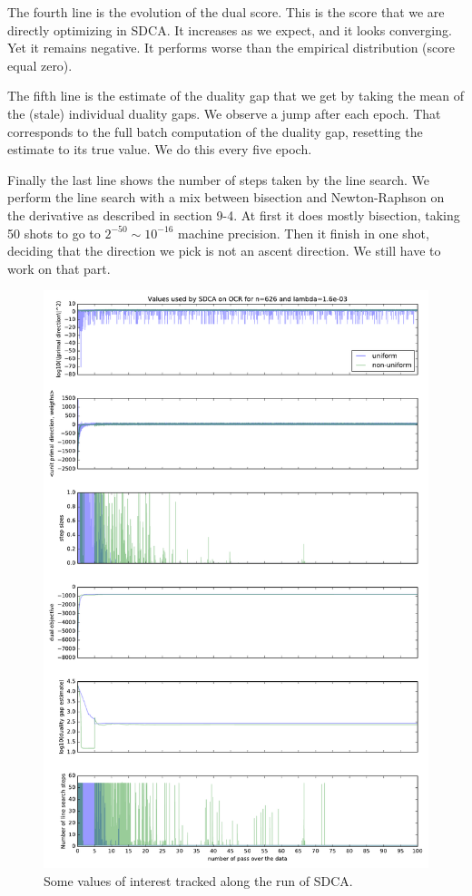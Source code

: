 \documentclass{article}
\DeclareMathOperator{\1}{\mathbb{1}}
\begin{document}
The fourth line is the evolution of the dual score.
This is the score that we are directly optimizing in SDCA.
It increases as we expect, and it looks converging.
Yet it remains negative.
It performs worse than the empirical distribution (score equal zero).

The fifth line is the estimate of the duality gap that we get by taking the mean of the (stale) individual duality gaps.
We observe a jump after each epoch.
That corresponds to the full batch computation of the duality gap, resetting the estimate to its true value.
We do this every five epoch.

Finally the last line shows the number of steps taken by the line search.
We perform the line search with a mix between bisection and Newton-Raphson on the derivative as described in \cite{press_numerical_1992} section 9-4.
At first it does mostly bisection, taking 50 shots to go to $2^{-50} \sim 10^{-16}$ machine precision.
Then it finish in one shot, deciding that the direction we pick is not an ascent direction.
We still have to work on that part.

\begin{figure}[ht]
    \centering
	\includegraphics[width=\textwidth]{images/20170922_002859_ocr_annex.pdf}
    \caption{Some values of interest tracked along the run of SDCA.}
	\label{ocr annexes}
\end{figure}
\end{document}

